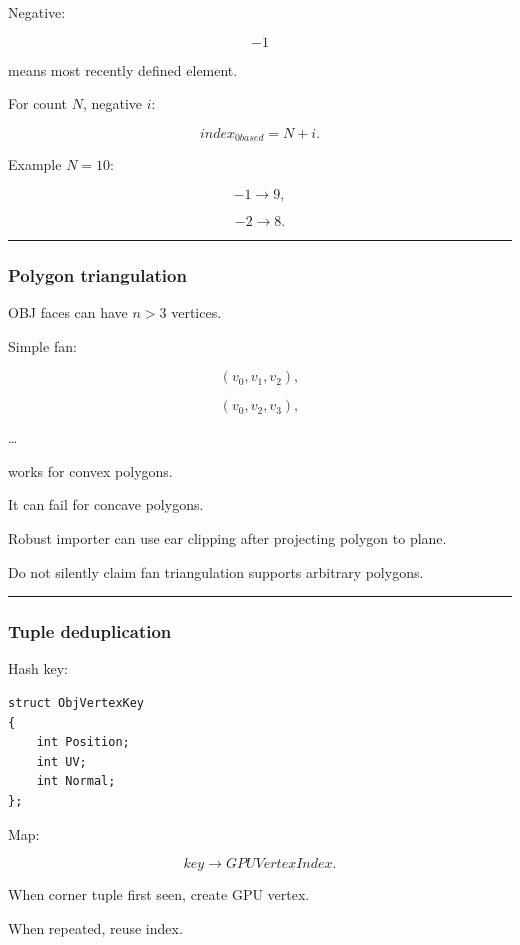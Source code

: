 Negative:

\[
-1
\]

means most recently defined element.

For count \(N\), negative \(i\):

\[
\boxed{
index_{0based}
=
N+i.
}
\]

Example \(N=10\):

\[
-1\rightarrow9,
\]

\[
-2\rightarrow8.
\]

\begin{center}\rule{0.5\linewidth}{0.5pt}\end{center}

\subsubsection{Polygon triangulation}\label{polygon-triangulation}

OBJ faces can have \(n>3\) vertices.

Simple fan:

\[
(v_0,v_1,v_2),
\]

\[
(v_0,v_2,v_3),
\]

\ldots{}

works for convex polygons.

It can fail for concave polygons.

Robust importer can use ear clipping after projecting polygon to plane.

Do not silently claim fan triangulation supports arbitrary polygons.

\begin{center}\rule{0.5\linewidth}{0.5pt}\end{center}

\subsubsection{Tuple deduplication}\label{tuple-deduplication}

Hash key:

\begin{verbatim}
struct ObjVertexKey
{
    int Position;
    int UV;
    int Normal;
};
\end{verbatim}

Map:

\[
key\rightarrow GPUVertexIndex.
\]

When corner tuple first seen, create GPU vertex.

When repeated, reuse index.

